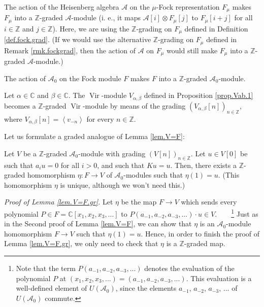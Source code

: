\documentclass[etingof-lie.tex]{subfiles}
\begin{document}
\begin{example}
The action of the Heisenberg algebra $\mathcal{A}$ on the $\mu$-Fock
representation $F_{\mu}$ makes $F_{\mu}$ into a $\mathbb{Z}$-graded
$\mathcal{A}$-module (i. e., it maps $\mathcal{A}\left[  i\right]  \otimes
F_{\mu}\left[  j\right]  $ to $F_{\mu}\left[  i+j\right]  $ for all
$i\in\mathbb{Z}$ and $j\in\mathbb{Z}$). Here, we are using the $\mathbb{Z}%
$-grading on $F_{\mu}$ defined in Definition \ref{def.fock.grad}. (If we would
use the alternative $\mathbb{Z}$-grading on $F_{\mu}$ defined in Remark
\ref{rmk.fockgrad}, then the action of $\mathcal{A}$ on $F_{\mu}$ would still
make $F_{\mu}$ into a $\mathbb{Z}$-graded $\mathcal{A}$-module.)

The action of $\mathcal{A}_{0}$ on the Fock module $F$ makes $F$ into a
$\mathbb{Z}$-graded $\mathcal{A}_{0}$-module.
\end{example}

\begin{example}
Let $\alpha\in\mathbb{C}$ and $\beta\in\mathbb{C}$. The $\operatorname*{Vir}%
$-module $V_{\alpha,\beta}$ defined in Proposition \ref{prop.Vab.1} becomes a
$\mathbb{Z}$-graded $\operatorname*{Vir}$-module by means of the grading
$\left(  V_{\alpha,\beta}\left[  n\right]  \right)  _{n\in\mathbb{Z}}$, where
$V_{\alpha,\beta}\left[  n\right]  =\left\langle v_{-n}\right\rangle $ for
every $n\in\mathbb{Z}$.
\end{example}

Let us formulate a graded analogue of Lemma \ref{lem.V=F}:

\begin{lemma}
\label{lem.V=F.gr}Let $V$ be a $\mathbb{Z}$-graded $\mathcal{A}_{0}$-module
with grading $\left(  V\left[  n\right]  \right)  _{n\in\mathbb{Z}}$. Let
$u\in V\left[  0\right]  $ be such that $a_{i}u=0$ for all $i>0$, and such
that $Ku=u$. Then, there exists a $\mathbb{Z}$-graded homomorphism
$\eta:F\rightarrow V$ of $\mathcal{A}_{0}$-modules such that $\eta\left(
1\right)  =u$. (This homomorphism $\eta$ is unique, although we won't need this.)
\end{lemma}

\textit{Proof of Lemma \ref{lem.V=F.gr}.} Let $\eta$ be the map $F\rightarrow
V$ which sends every polynomial $P\in F=\mathbb{C}\left[  x_{1},x_{2}%
,x_{3},...\right]  $ to $P\left(  a_{-1},a_{-2},a_{-3},...\right)  \cdot u\in
V$.\ \ \ \ \footnote{Note that the term $P\left(  a_{-1},a_{-2},a_{-3}%
,...\right)  $ denotes the evaluation of the polynomial $P$ at $\left(
x_{1},x_{2},x_{3},...\right)  =\left(  a_{-1},a_{-2},a_{-3},...\right)  $.
This evaluation is a well-defined element of $U\left(  \mathcal{A}_{0}\right)
$, since the elements $a_{-1}$, $a_{-2}$, $a_{-3}$, $...$ of $U\left(
\mathcal{A}_{0}\right)  $ commute.} Just as in the Second proof of Lemma
\ref{lem.V=F}, we can show that $\eta$ is an $\mathcal{A}_{0}$-module
homomorphism $F\rightarrow V$ such that $\eta\left(  1\right)  =u$. Hence, in
order to finish the proof of Lemma \ref{lem.V=F.gr}, we only need to check
that $\eta$ is a $\mathbb{Z}$-graded map.
\end{document}
